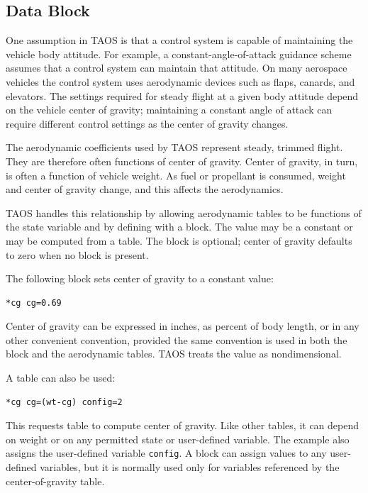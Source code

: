 \subsection{ Data Block}\label{sec:block-cg}

One assumption in TAOS is that a control system is capable of maintaining the
vehicle body attitude. For example, a constant-angle-of-attack guidance scheme
assumes that a control system can maintain that attitude. On many aerospace
vehicles the control system uses aerodynamic devices such as flaps, canards, and
elevators. The settings required for steady flight at a given body attitude depend on
the vehicle center of gravity; maintaining a constant angle of attack can require
different control settings as the center of gravity changes.

The aerodynamic coefficients used by TAOS represent steady, trimmed flight. They
are therefore often functions of center of gravity. Center of gravity, in turn, is often a
function of vehicle weight. As fuel or propellant is consumed, weight and center of
gravity change, and this affects the aerodynamics.

TAOS handles this relationship by allowing aerodynamic tables to be functions of
the  state variable and by defining  with a
 block. The value may be a constant or may be computed from a
table. The block is optional; center of gravity defaults to zero when no block is
present.

The following block sets center of gravity to a constant value:

\begin{lstlisting}[style=taosmanual]
*cg cg=0.69
\end{lstlisting}

Center of gravity can be expressed in inches, as percent of body length, or in any
other convenient convention, provided the same convention is used in both the
 block and the aerodynamic tables. TAOS treats the value as
nondimensional.

A table can also be used:

\begin{lstlisting}[style=taosmanual]
*cg cg=(wt-cg) config=2
\end{lstlisting}

This requests table  to compute center of gravity. Like other tables,
it can depend on weight or on any permitted state or user-defined variable. The
example also assigns the user-defined variable \texttt{config}. A
 block can assign values to any user-defined variables, but it is
normally used only for variables referenced by the center-of-gravity table.
